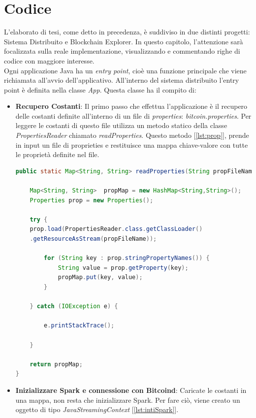 \section{Codice}
\label{sec:codice}
L'elaborato di tesi, come detto in precedenza, è suddiviso in due distinti progetti: Sistema Distribuito e Blockchain Explorer. In questo capitolo, l'attenzione sarà focalizzata sulla reale implementazione, visualizzando e commentando righe di codice con maggiore interesse.
\\ Ogni applicazione Java ha un \textit{entry point}, cioè una funzione principale che viene richiamata all'avvio dell'applicativo. All'interno del sistema distribuito l'entry point è definita nella classe \textit{App}. Questa classe ha il compito di:
\begin{itemize}
\item \textbf{Recupero Costanti}: Il primo passo che effettua l'applicazione è il recupero delle costanti definite all'interno di un file di \textit{properties}: \textit{bitcoin.properties}. Per leggere le costanti di questo file utilizza un metodo statico della classe \textit{PropertiesReader} chiamato \textit{readProperties}. Questo metodo [\ref{lst:prop}], prende in input un file di proprieties e restituisce una mappa chiave-valore con tutte le proprietà definite nel file.

\begin{lstlisting}[language=Java, label=lst:prop, caption={Metodo readProperties.}]
public static Map<String, String> readProperties(String propFileName){

	Map<String, String>  propMap = new HashMap<String,String>();
	Properties prop = new Properties();

	try {
	prop.load(PropertiesReader.class.getClassLoader()
	.getResourceAsStream(propFileName));

		for (String key : prop.stringPropertyNames()) {
			String value = prop.getProperty(key);
			propMap.put(key, value);
		}

	} catch (IOException e) {

		e.printStackTrace();

	}

	return propMap;
}
\end{lstlisting}

\item \textbf{Inizializzare Spark e connessione con Bitcoind}: Caricate le costanti in una mappa, non resta che inizializzare Spark. Per fare ciò, viene creato un oggetto di tipo \textit{JavaStreamingContext} [\ref{lst:intiSpark}].


\end{itemize}
